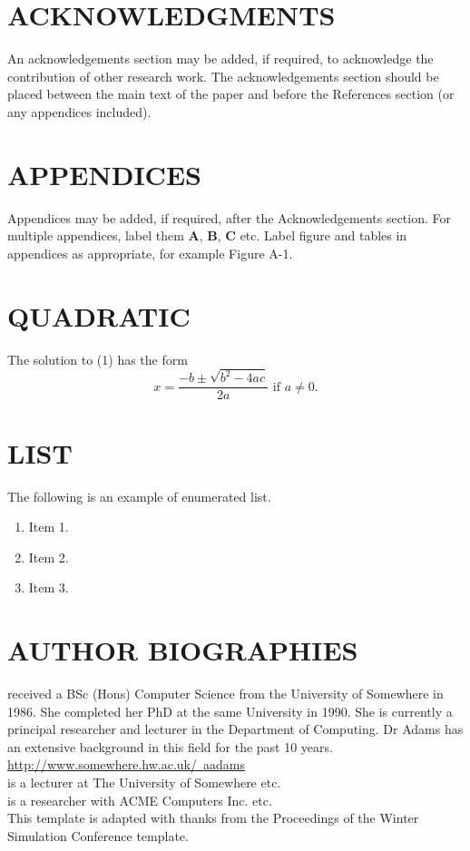\documentclass{swpaperproc}
\theoremstyle{sw}
\begin{document}
\section*{ACKNOWLEDGMENTS}
An acknowledgements section may be added, if required, to acknowledge the contribution of
other research work. The acknowledgements section should be placed between the main text of
the paper and before the References section (or any appendices included).

\appendix

\section{APPENDICES} \label{app:quadratic}
Appendices may be added, if required, after the Acknowledgements section. For multiple appendices, label them \textbf{A}, \textbf{B}, \textbf{C} etc. Label figure and tables in appendices as appropriate, for example Figure A-1.

\section{QUADRATIC}
The solution to (1) has the form
\begin{equation} \label{eq: quadratic sol}
x = \frac{-b \pm \sqrt{b^2-4ac}}{2a} \mbox{ if } a \ne 0.
\end{equation}

\section{LIST}

The following is an example of enumerated list.


\begin{enumerate}
\item   Item 1.
\item	Item 2.
\item	Item 3.
\end{enumerate}




\section*{AUTHOR BIOGRAPHIES}

 received a BSc (Hons) Computer Science from the University of Somewhere in
1986. She completed her PhD at the same University in 1990. She is currently a principal
researcher and lecturer in the Department of Computing. Dr Adams has an extensive background
in this field for the past 10 years. \href{http://www.somewhere.hw.ac.uk/~aadams}{http://www.somewhere.hw.ac.uk/~aadams}\\

 is a lecturer at The University of Somewhere etc.\\

 is a researcher with ACME Computers Inc. etc.\\

\noindent This template is adapted with thanks from the Proceedings of the Winter Simulation Conference template.
\end{document}
